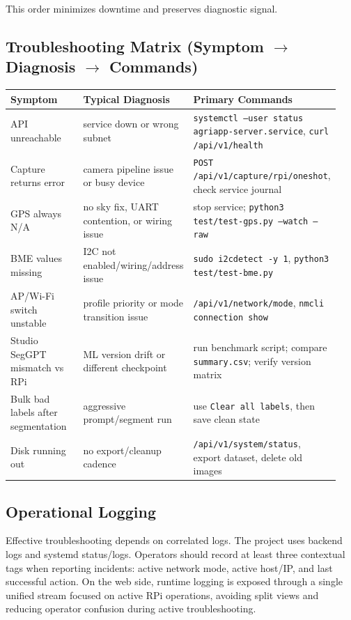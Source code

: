 This order minimizes downtime and preserves diagnostic signal.

\subsection{Troubleshooting Matrix (Symptom $\rightarrow$ Diagnosis $\rightarrow$ Commands)}
\begin{longtable}{p{0.27\linewidth} p{0.29\linewidth} p{0.38\linewidth}}
\toprule
Symptom & Typical Diagnosis & Primary Commands \\
\midrule
API unreachable & service down or wrong subnet & \texttt{systemctl --user status agriapp-server.service}, \texttt{curl /api/v1/health} \\
Capture returns error & camera pipeline issue or busy device & \texttt{POST /api/v1/capture/rpi/oneshot}, check service journal \\
GPS always N/A & no sky fix, UART contention, or wiring issue & stop service; \texttt{python3 test/test-gps.py --watch --raw} \\
BME values missing & I2C not enabled/wiring/address issue & \texttt{sudo i2cdetect -y 1}, \texttt{python3 test/test-bme.py} \\
AP/Wi-Fi switch unstable & profile priority or mode transition issue & \texttt{/api/v1/network/mode}, \texttt{nmcli connection show} \\
Studio SegGPT mismatch vs RPi & ML version drift or different checkpoint & run benchmark script; compare \texttt{summary.csv}; verify version matrix \\
Bulk bad labels after segmentation & aggressive prompt/segment run & use \texttt{Clear all labels}, then save clean state \\
Disk running out & no export/cleanup cadence & \texttt{/api/v1/system/status}, export dataset, delete old images \\
\bottomrule
\end{longtable}

\subsection{Operational Logging}
Effective troubleshooting depends on correlated logs. The project uses backend logs and systemd status/logs. Operators should record at least three contextual tags when reporting incidents: active network mode, active host/IP, and last successful action.
On the web side, runtime logging is exposed through a single unified stream focused on active RPi operations, avoiding split views and reducing operator confusion during active troubleshooting.

